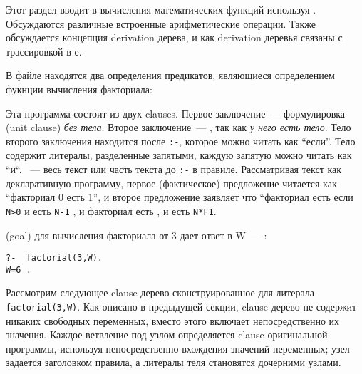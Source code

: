 \label{fish22}

Этот раздел вводит в вычисления математических функций используя \prolog.
Обсуждаются различные встроенные арифметические операции. Также обсуждается
концепция derivation дерева, и как derivation деревья связаны с трассировкой в
\prolog е.

В файле  находятся два определения предикатов, являющиеся
определением фукнции вычисления факториала:

 
Эта программа состоит из двух clauses. Первое заключение\ --- формулировка
 (unit clause) \emph{без тела}. Второе заключение\ ---
, так как \emph{у него есть тело}. Тело второго
заключения находится после \verb|:-|, которое можно читать как ``если''. Тело
содержит литералы, разделенные запятыми, каждую запятую можно читать как ``и``.
\ --- весь текст  или
часть текста до \verb|:-| в правиле. Рассматривая текст как декларативную
программу, первое (фактическое) предложение читается как ``факториал 0 есть
1'',
и второе предложение заявляет что ``факториал  есть  если \verb|N>0| и  есть
\verb|N-1| , и факториал  есть , и  есть \verb|N*F1|.

 (goal) для вычисления факториала от 3
дает ответ в W\ --- :

\begin{verbatim}
?-  factorial(3,W).  
W=6 . 
\end{verbatim}

Рассмотрим следующее clause дерево сконструированное для литерала\\
\verb|factorial(3,W)|. Как описано в предыдущей секции, clause дерево не
содержит никаких свободных переменных, вместо этого включает непосредственно их
значения. Каждое ветвление под узлом определяется clause оригинальной программы,
используя непосредственно вхождения значений переменных; узел задается
заголовком правила, а литералы теля становятся дочерними узлами.


